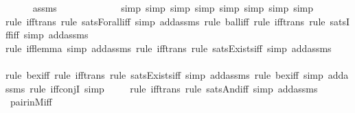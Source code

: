 \begin{isabellebody}
\ \ \ \ \isamarkupfalse%
\ assms\ \isanewline
\ \ \ \ \ \ \ \ \ \ \ \isamarkupfalse%
{\isacharparenleft}{\kern0pt}simp{\isacharcomma}{\kern0pt}\ simp{\isacharcomma}{\kern0pt}\ simp{\isacharcomma}{\kern0pt}\ simp{\isacharcomma}{\kern0pt}\ simp{\isacharcomma}{\kern0pt}\ simp{\isacharcomma}{\kern0pt}\ simp{\isacharcomma}{\kern0pt}\ simp{\isacharparenright}{\kern0pt}\isanewline
\ \ \ \ \isamarkupfalse%
{\isacharparenleft}{\kern0pt}rule\ iff{\isacharunderscore}{\kern0pt}trans{\isacharcomma}{\kern0pt}\ rule\ sats{\isacharunderscore}{\kern0pt}Forall{\isacharunderscore}{\kern0pt}iff{\isacharcomma}{\kern0pt}\ simp\ add{\isacharcolon}{\kern0pt}assms{\isacharcomma}{\kern0pt}\ rule\ ball{\isacharunderscore}{\kern0pt}iff{\isacharcomma}{\kern0pt}\ rule\ iff{\isacharunderscore}{\kern0pt}trans{\isacharcomma}{\kern0pt}\ rule\ sats{\isacharunderscore}{\kern0pt}Iff{\isacharunderscore}{\kern0pt}iff{\isacharcomma}{\kern0pt}\ simp\ add{\isacharcolon}{\kern0pt}assms{\isacharparenright}{\kern0pt}\isanewline
\ \ \ \ \isamarkupfalse%
{\isacharparenleft}{\kern0pt}rule\ iff{\isacharunderscore}{\kern0pt}lemma{}{\isacharcomma}{\kern0pt}\ simp\ add{\isacharcolon}{\kern0pt}assms{\isacharcomma}{\kern0pt}\ rule\ iff{\isacharunderscore}{\kern0pt}trans{\isacharcomma}{\kern0pt}\ rule\ sats{\isacharunderscore}{\kern0pt}Exists{\isacharunderscore}{\kern0pt}iff{\isacharcomma}{\kern0pt}\ simp\ add{\isacharcolon}{\kern0pt}assms{\isacharparenright}{\kern0pt}\isanewline
\ \ \ \ \isamarkupfalse%
{\isacharparenleft}{\kern0pt}rule\ bex{\isacharunderscore}{\kern0pt}iff{\isacharcomma}{\kern0pt}\ rule\ iff{\isacharunderscore}{\kern0pt}trans{\isacharcomma}{\kern0pt}\ rule\ sats{\isacharunderscore}{\kern0pt}Exists{\isacharunderscore}{\kern0pt}iff{\isacharcomma}{\kern0pt}\ simp\ add{\isacharcolon}{\kern0pt}assms{\isacharcomma}{\kern0pt}\ rule\ bex{\isacharunderscore}{\kern0pt}iff{\isacharcomma}{\kern0pt}\ simp\ add{\isacharcolon}{\kern0pt}assms{\isacharcomma}{\kern0pt}\ rule\ iff{\isacharunderscore}{\kern0pt}conjI{\isacharcomma}{\kern0pt}\ simp{\isacharparenright}{\kern0pt}\isanewline
\ \ \ \ \isamarkupfalse%
{\isacharparenleft}{\kern0pt}rule\ iff{\isacharunderscore}{\kern0pt}trans{\isacharcomma}{\kern0pt}\ rule\ sats{\isacharunderscore}{\kern0pt}And{\isacharunderscore}{\kern0pt}iff{\isacharcomma}{\kern0pt}\ simp\ add{\isacharcolon}{\kern0pt}assms{\isacharparenright}{\kern0pt}\isanewline
\ \ \ \ \isamarkupfalse%
\ pair{\isacharunderscore}{\kern0pt}in{\isacharunderscore}{\kern0pt}M{\isacharunderscore}{\kern0pt}iff\ \isanewline

\end{isabellebody}
